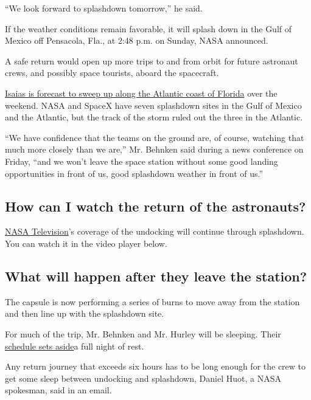 ``We look forward to splashdown tomorrow,'' he said.

If the weather conditions remain favorable, it will splash down in the
Gulf of Mexico off Pensacola, Fla., at 2:48 p.m. on Sunday, NASA
announced.

A safe return would open up more trips to and from orbit for future
astronaut crews, and possibly space tourists, aboard the spacecraft.

\href{https://www.nytimes.com/2020/08/01/us/hurricane-isaias-track.html}{Isaias
is forecast to sweep up along the Atlantic coast of Florida} over the
weekend. NASA and SpaceX have seven splashdown sites in the Gulf of
Mexico and the Atlantic, but the track of the storm ruled out the three
in the Atlantic.

``We have confidence that the teams on the ground are, of course,
watching that much more closely than we are,'' Mr. Behnken said during a
news conference on Friday, ``and we won't leave the space station
without some good landing opportunities in front of us, good splashdown
weather in front of us.''

\hypertarget{how-can-i-watch-the-return-of-the-astronauts}{%
\subsection{How can I watch the return of the
astronauts?}\label{how-can-i-watch-the-return-of-the-astronauts}}

\href{https://www.nasa.gov/multimedia/nasatv/\#public}{NASA
Television}'s coverage of the undocking will continue through
splashdown. You can watch it in the video player below.

\hypertarget{what-will-happen-after-they-leave-the-station}{%
\subsection{What will happen after they leave the
station?}\label{what-will-happen-after-they-leave-the-station}}

The capsule is now performing a series of burns to move away from the
station and then line up with the splashdown site.

For much of the trip, Mr. Behnken and Mr. Hurley will be sleeping. Their
\href{https://twitter.com/NASA/status/1289245570565992449}{schedule sets
aside}a full night of rest.

Any return journey that exceeds six hours has to be long enough for the
crew to get some sleep between undocking and splashdown, Daniel Huot, a
NASA spokesman, said in an email.

